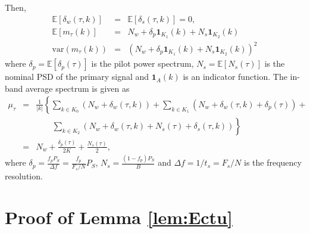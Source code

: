 \documentclass[draftclsnofoot,onecolumn,12pt]{IEEEtran}
\begin{document}
Then,
\begin{eqnarray}
  \mathbb{E} \left[\delta_w(\tau, k)\right] &=& \mathbb{E} \left[\delta_s(\tau, k)\right] = 0, \label{eq:Edeltaw} \\
  \mathbb{E} \left[m_\tau(k)\right] &=& N_w + \delta_p \mathbf{1}_{K_1}(k) + N_s \mathbf{1}_{K_2}(k) \\
\mathrm{var}\left(m_\tau(k)\right) &=& \left( N_w + \delta_p \mathbf{1}_{K_1}(k) + N_s \mathbf{1}_{K_2}(k) \right)^2 \end{eqnarray}
where $\delta_p = \mathbb{E} [\delta_p(\tau)]$ is the pilot power spectrum, $N_s = {\mathbb{E} [N_s(\tau)]}$ is the nominal PSD of the primary signal and $\mathbf{1}_A(k)$ is an indicator function.  The in-band average spectrum is given as
\begin{eqnarray}
    \mu_\tau &=& \frac{1}{|k|} \left\{ \sum_{k \in K_0} \left(N_w + \delta_w(\tau, k)\right) +
                \sum_{k \in K_1} \left(N_w + \delta_w(\tau,k) +  \delta_p(\tau)\right) + \right. \nonumber \\
                & & \;\;\;\;\;\;\; \left. \sum_{k \in K_2} \left(N_w + \delta_w(\tau, k) + N_s(\tau) + \delta_s(\tau,k)\right) \right\} \nonumber \\
		&=& N_w + \frac{\delta_p(\tau)}{2K} + \frac{N_s(\tau)}{2}, \label{eq:mu_tau_pf}
\end{eqnarray}
where
$ \delta_p = \frac{f_p P_S}{\Delta f} = \frac{f_p}{F_s/N}P_S$, $N_s = \frac{(1-f_p)P_S}{B}$
and $\Delta f = 1/t_s = F_s/N$ is the frequency resolution.

\section{Proof of Lemma \ref{lem:Ectu}}
\label{apdx:proof_Ectu}
\end{document}
